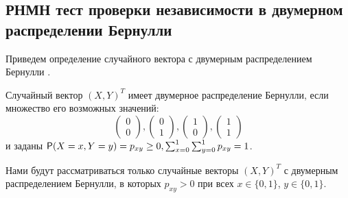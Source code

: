 \subsection{РНМН тест проверки независимости в двумерном
распределении Бернулли}\label{bivariate_umpu}


Приведем определение случайного вектора с 
двумерным распределением Бернулли \cite{Dai2013}.
\begin{definition}
    Случайный вектор $(X,Y)^T$ имеет двумерное распределение Бернулли,
    если множество его возможных значений:
    $$
        \begin{pmatrix}
            0 \\
            0
        \end{pmatrix},
        \begin{pmatrix}
            0 \\
            1
        \end{pmatrix},
        \begin{pmatrix}
            1 \\
            0
        \end{pmatrix},
        \begin{pmatrix}
            1 \\
            1
        \end{pmatrix}
    $$ и заданы $\mathsf{P}(X=x,Y=y)=p_{xy} \geq 0,  \sum_{x=0}^1 \sum_{y=0}^1 p_{xy} =1$.
\end{definition}
Нами будут рассматриваться только случайные
векторы $(X,Y)^T$ с двумерным распределением Бернулли,
в которых $p_{xy} > 0$ при всех
$x \in \{0,1\}$, $y\in \{0,1\}$.
